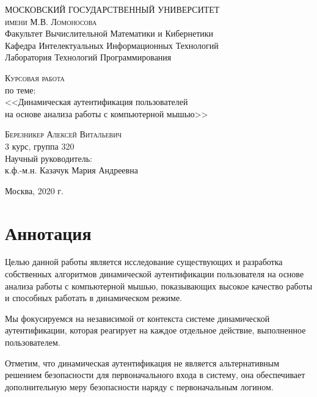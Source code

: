 \documentclass[12pt]{article}
\begin{document}
    \begin{titlepage}
        \begin{center}
            \textsc{
            \large
            МОСКОВСКИЙ ГОСУДАРСТВЕННЫЙ УНИВЕРСИТЕТ \\
            имени М.В. Ломоносова
            } \\
            [5mm]

            Факультет Вычислительной Математики и Кибернетики \\
            Кафедра Интелектуальных Информационных Технологий \\
            Лаборатория Технологий Программирования 
            \vfill
    
            \textsc{Курсовая работа} \\
            по теме: \\
            [5mm]
            {\LARGE
            <<Динамическая аутентификация пользователей \\
            на основе анализа работы с компьютерной мышью>>
            }
            \vfill
            \begin{flushright}
                \textsc{Березникер Алексей Витальевич} \\
                3 курс, группа 320 \\
                [5mm]
                Научный руководитель: \\
                к.ф.-м.н. Казачук Мария Андреевна \\
            \end{flushright}
            \vfill

            Москва, 2020 г.
        \end{center}
    \end{titlepage}



    \tableofcontents
    \newpage



    \section{Аннотация}
    \label{sec:Annotation}

    \par Целью данной работы является исследование существующих и разработка собственных алгоритмов динамической аутентификации пользователя на основе анализа работы с компьютерной мышью, показывающих высокое качество работы и способных работать в динамическом режиме. \\
    \par Мы фокусируемся на независимой от контекста системе динамической аутентификации, которая реагирует на каждое отдельное действие, выполненное пользователем. \\
    \par Отметим, что динамическая аутентификация не является альтернативным решением безопасности для первоначального входа в систему, она обеспечивает дополнительную меру безопасности наряду с первоначальным логином.
\end{document}

